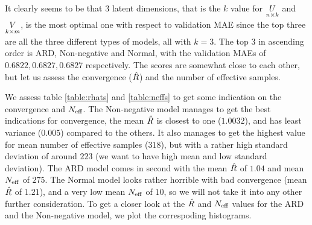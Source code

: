\documentclass[12pt]{article}
\begin{document}
    It clearly seems to be that $3$ latent dimensions, that is the $k$ value for $\underset{n \times k}{U}$ and $\underset{k \times m}{V}$, is the most optimal one with respect to validation MAE since the top three are all the three different types of models, all with $k=3$. The top 3 in ascending order is ARD, Non-negative and Normal, with the validation MAEs of $0.6822, 0.6827, 0.6827$ respectively. The scores are somewhat close to each other, but let us assess the convergence ($\hat{R}$) and the number of effective samples. 

    \vspace{3mm}
    We assess table \ref{table:rhats} and \ref{table:neffs} to get some indication on the convergence and $N_{\text{eff}}$. The Non-negative model manages to get the best indications for convergence, the mean $\hat{R}$ is closest to one ($1.0032$), and has least variance ($0.005$) compared to the others. It also manages to get the highest value for mean number of effective samples ($318$), but with a rather high standard deviation of around $223$ (we want to have high mean and low standard deviation). The ARD model comes in second with the mean $\hat{R}$ of $1.04$ and mean $N_{\text{eff}}$ of $275$. The Normal model looks rather horrible with bad convergence (mean $\hat{R}$ of $1.21$), and a very low mean $N_{\text{eff}}$ of $10$, so we will not take it into any other further consideration. To get a closer look at the $\hat{R}$ and $N_{\text{eff}}$ values for the ARD and the Non-negative model, we plot the correspoding histograms.
\end{document}
